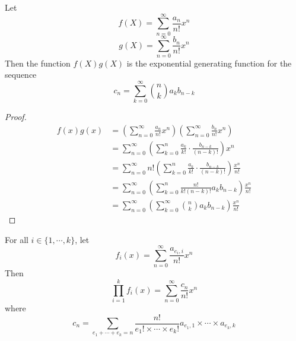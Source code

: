 \begin{theorem}[Multiplication]
    Let $$f(X)=\sum_{n=0}^{\infty}\frac{a_n}{n!}x^n$$
    $$g(X)=\sum_{n=0}^{\infty}\frac{b_n}{n!}x^n$$
    Then the function $f(X)g(X)$ is the exponential generating function for the sequence $$c_n=\sum_{k=0}^{\infty}{n \choose k}a_kb_{n-k}$$
\end{theorem}
\begin{proof}
    \begin{equation}
        \begin{split}
            f(x)g(x) &= (\sum_{n=0}^{\infty}\frac{a_n}{n!}x^n)(\sum_{n=0}^{\infty}\frac{b_n}{n!}x^n)\\
            &= \sum_{n=0}^{\infty}(\sum_{k=0}^{n}\frac{a_k}{k!} \cdot \frac{b_{n-k}}{(n-k)!})x^n\\
            &= \sum_{n=0}^{\infty}n!(\sum_{k=0}^{n}\frac{a_k}{k!} \cdot \frac{b_{n-k}}{(n-k)!})\frac{x^n}{n!}\\
            &= \sum_{n=0}^{\infty}(\sum_{k=0}^{n}\frac{n!}{k!(n-k)!}a_kb_{n-k})\frac{x^n}{n!}\\
            &= \sum_{n=0}^{\infty}(\sum_{k=0}^{\infty}{n \choose k}a_kb_{n-k})\frac{x^n}{n!}
        \end{split}
    \end{equation}
\end{proof}

\begin{theorem}
    For all $i \in \{1, \cdots ,k\}$, let $$f_i(x)=\sum_{n=0}^{\infty}\frac{a_{e_i,i}}{n!}x^n$$
    Then $$\prod_{i=1}^{k}f_i(x)=\sum_{n=0}^{\infty}\frac{c_n}{n!}x^n$$
    where $$c_n=\sum_{e_1+ \cdots +e_k=n}\frac{n!}{e_1! \times \cdots \times e_k!}a_{e_1,1}\times \cdots \times a_{e_k,k}$$
\end{theorem}

